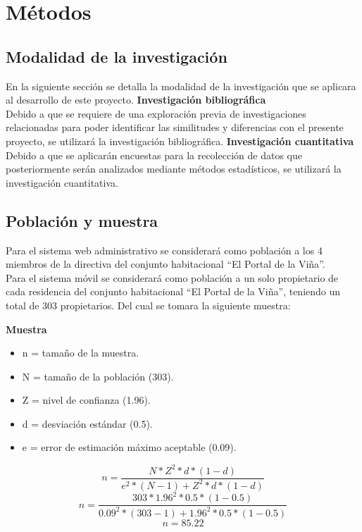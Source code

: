 \section{Métodos}
\subsection{Modalidad de la investigación}
En la siguiente sección se detalla la modalidad de la investigación que se aplicara al desarrollo de este proyecto.
\bigbreak
\textbf{Investigación bibliográfica} \\
Debido a que se requiere de una exploración previa de investigaciones relacionadas para poder identificar las similitudes y diferencias con el presente proyecto, se utilizará la investigación bibliográfica.
\bigbreak
\textbf{Investigación cuantitativa} \\
Debido a que se aplicarán encuestas para la recolección de datos que posteriormente serán analizados mediante métodos estadísticos, se utilizará la investigación cuantitativa.

\subsection{Población y muestra}\label{subsec:poblacion}

Para el sistema web administrativo se considerará como población a los 4 miembros de la directiva del conjunto habitacional {\textquotedblleft}El Portal de la Viña{\textquotedblright}.\\

Para el sistema móvil se considerará como población a un solo propietario de cada residencia del conjunto habitacional {\textquotedblleft}El Portal de la Viña{\textquotedblright}, teniendo un total de 303 propietarios. Del cual se tomara la siguiente muestra:

\bigbreak
\textbf{Muestra}
\begin{itemize}
    \item n = tamaño de la muestra.
    \item N = tamaño de la población (303).
    \item Z = nivel de confianza (1.96).
    \item d = desviación estándar (0.5).
    \item e = error de estimación máximo aceptable (0.09).
\end{itemize}
\begin{equation}
    \label{eq:equation}
    n = \frac{N * Z^2 * d * (1-d)}{e^2 * (N-1) + Z^2 * d * (1-d)}
\end{equation}
\begin{equation}
    \label{eq:equation1}
    n = \frac{303 * 1.96^2 * 0.5 * (1-0.5)}{0.09^2 * (303-1) + 1.96^2 * 0.5 * (1-0.5)}
\end{equation}
\begin{equation}
    \label{eq:equation2}
    n = 85.22
\end{equation}

